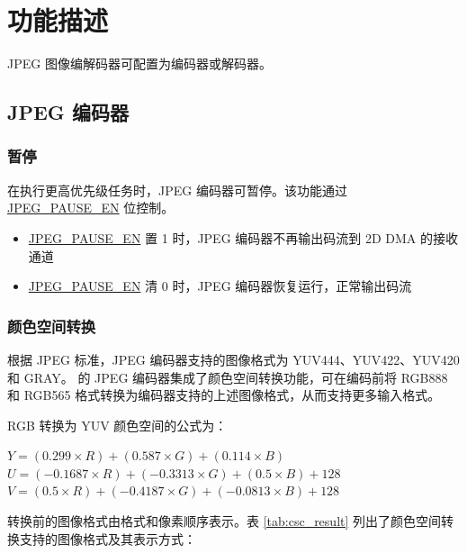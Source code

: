 \documentclass[main\_\_CN.tex]{subfiles}
\begin{document}
\section{功能描述}
\label{sec:jpegcodec-func-descr}

JPEG 图像编解码器可配置为编码器或解码器。

\subsection{JPEG 编码器}
\label{sec:jpegcodec-enc-mode}

\subsubsection{暂停}
\label{sec:jpegcodec-enc-pause}


在执行更高优先级任务时，JPEG 编码器可暂停。该功能通过 \hyperref[fielddesc:JPEGPAUSEEN]{JPEG\_PAUSE\_EN} 位控制。

\begin{itemize}
    \item \hyperref[fielddesc:JPEGPAUSEEN]{JPEG\_PAUSE\_EN} 置 1 时，JPEG 编码器不再输出码流到 2D DMA 的接收通道
    \item \hyperref[fielddesc:JPEGPAUSEEN]{JPEG\_PAUSE\_EN} 清 0 时，JPEG 编码器恢复运行，正常输出码流
\end{itemize}

\subsubsection{颜色空间转换}
\label{sec:jpegcodec-enc-csc}

根据 JPEG 标准，JPEG 编码器支持的图像格式为 YUV444、YUV422、YUV420 和 GRAY。\chipname{} 的 JPEG 编码器集成了颜色空间转换功能，可在编码前将 RGB888 和 RGB565 格式转换为编码器支持的上述图像格式，从而支持更多输入格式。

RGB 转换为 YUV 颜色空间的公式为：
\begin{center}
$Y = (0.299 \times R) + (0.587 \times G) + (0.114 \times B)$ \\
$U = (-0.1687 \times R) + (-0.3313 \times G) + (0.5 \times B) + 128$ \\
$V = (0.5 \times R) + (-0.4187 \times G) + (-0.0813 \times B) + 128$ \\
\end{center}

转换前的图像格式由格式和像素顺序表示。表 \ref{tab:csc_result} \textit{} 列出了颜色空间转换支持的图像格式及其表示方式：
\end{document}
